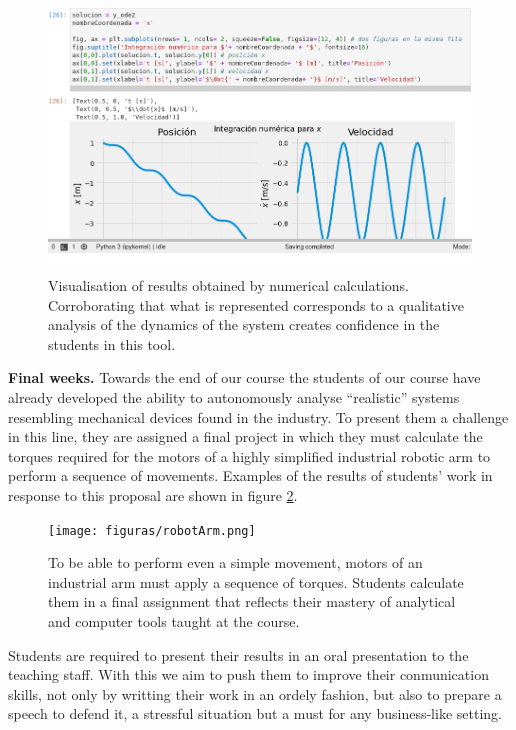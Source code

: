 \begin{figure}[!ht]
	\centering
	\includegraphics[width=\linewidth]{figuras/clase5Representación.png}
	\caption{
		Visualisation of results obtained by numerical calculations.
		Corroborating that what is represented corresponds to a qualitative analysis of the dynamics of the system creates confidence in the students in this tool.
	}
	\label{fig:clase5rep}
\end{figure}

\textbf{Final weeks.}
Towards the end of our course the students of our course have already developed the ability to autonomously analyse ``realistic'' systems resembling mechanical devices found in the industry.
To present them a challenge in this line, they are assigned a final project in which they must calculate the torques required for the motors of a highly simplified industrial robotic arm to perform a sequence of movements. 
Examples of the results of students' work in response to this proposal are shown in figure \ref{fig:robotarm}.

\begin{figure}[!ht]
\centering
\texttt{[image: figuras/robotArm.png]}
\caption{To be able to perform even a simple movement, motors of an industrial arm  must apply a sequence of torques. Students calculate them in a final assignment that reflects their mastery of analytical and computer tools taught at the course.}
\label{fig:robotarm}
\end{figure}

Students are required to present their results in an oral presentation to the teaching staff.
With this we aim to push them to improve their conmunication skills, not only by writting their work in an ordely fashion, but also to prepare a speech to defend it, a stressful situation but a must for any business-like setting.
